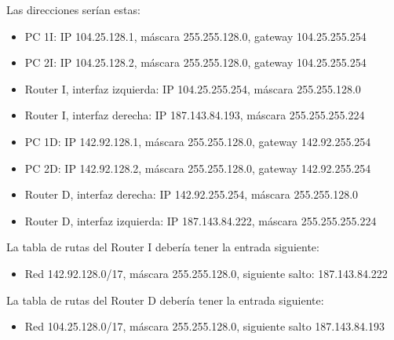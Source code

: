 \documentclass[letterpaper,10pt,spanish]{sphinxmanual}
\begin{document}
\sphinxAtStartPar
Las direcciones serían estas:
\begin{itemize}
\item {} 
\sphinxAtStartPar
PC 1I: IP 104.25.128.1, máscara 255.255.128.0, gateway 104.25.255.254

\item {} 
\sphinxAtStartPar
PC 2I: IP 104.25.128.2, máscara 255.255.128.0, gateway 104.25.255.254

\item {} 
\sphinxAtStartPar
Router I, interfaz izquierda: IP 104.25.255.254, máscara 255.255.128.0

\item {} 
\sphinxAtStartPar
Router I, interfaz derecha: IP 187.143.84.193, máscara 255.255.255.224

\item {} 
\sphinxAtStartPar
PC 1D: IP 142.92.128.1, máscara 255.255.128.0, gateway 142.92.255.254

\item {} 
\sphinxAtStartPar
PC 2D: IP 142.92.128.2, máscara 255.255.128.0, gateway 142.92.255.254

\item {} 
\sphinxAtStartPar
Router D, interfaz derecha: IP 142.92.255.254, máscara 255.255.128.0

\item {} 
\sphinxAtStartPar
Router D, interfaz izquierda: IP 187.143.84.222, máscara 255.255.255.224

\end{itemize}

\sphinxAtStartPar
La tabla de rutas del Router I debería tener la entrada siguiente:
\begin{itemize}
\item {} 
\sphinxAtStartPar
Red 142.92.128.0/17, máscara 255.255.128.0, siguiente salto: 187.143.84.222

\end{itemize}

\sphinxAtStartPar
La tabla de rutas del Router D debería tener la entrada siguiente:
\begin{itemize}
\item {} 
\sphinxAtStartPar
Red 104.25.128.0/17, máscara 255.255.128.0, siguiente salto 187.143.84.193

\end{itemize}
\end{document}
